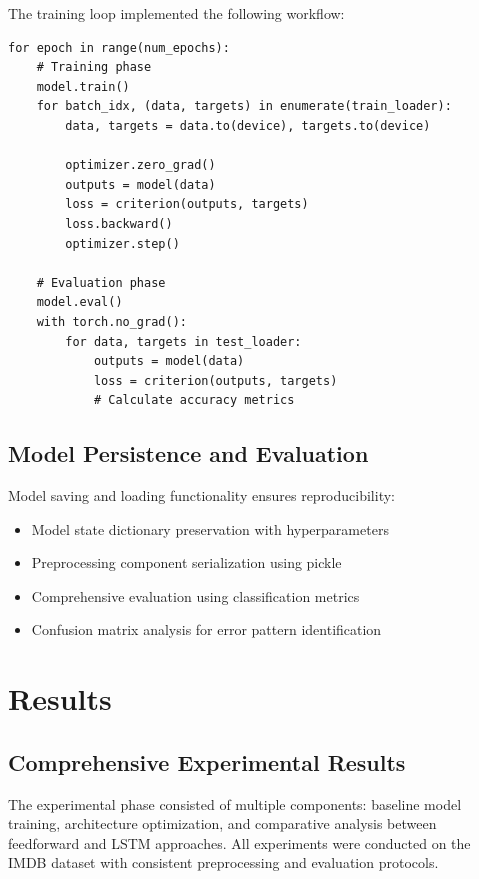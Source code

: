 \documentclass[a4paper, journal]{IEEEtran}
\begin{document}
The training loop implemented the following workflow:

\begin{lstlisting}[caption=Training Loop Implementation]
for epoch in range(num_epochs):
    # Training phase
    model.train()
    for batch_idx, (data, targets) in enumerate(train_loader):
        data, targets = data.to(device), targets.to(device)
        
        optimizer.zero_grad()
        outputs = model(data)
        loss = criterion(outputs, targets)
        loss.backward()
        optimizer.step()
    
    # Evaluation phase
    model.eval()
    with torch.no_grad():
        for data, targets in test_loader:
            outputs = model(data)
            loss = criterion(outputs, targets)
            # Calculate accuracy metrics
\end{lstlisting}

\subsection{Model Persistence and Evaluation}

Model saving and loading functionality ensures reproducibility:

\begin{itemize}
    \item Model state dictionary preservation with hyperparameters
    \item Preprocessing component serialization using pickle
    \item Comprehensive evaluation using classification metrics
    \item Confusion matrix analysis for error pattern identification
\end{itemize}



\section{Results}

\subsection{Comprehensive Experimental Results}

The experimental phase consisted of multiple components: baseline model training, architecture optimization, and comparative analysis between feedforward and LSTM approaches. All experiments were conducted on the IMDB dataset with consistent preprocessing and evaluation protocols.
\end{document}
